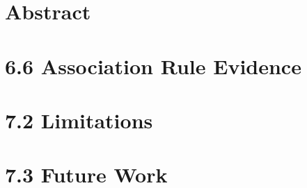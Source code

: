 \documentclass[a4paper,12pt]{article}
\begin{document}
\section*{Abstract}

\section*{6.6 Association Rule Evidence}
\newpage
\section*{7.2 Limitations}

\section*{7.3 Future Work}

\end{document}
